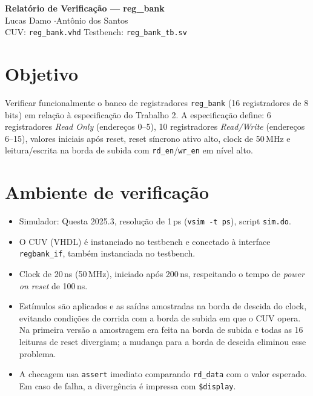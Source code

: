 \documentclass[a4paper,11pt]{article}
\begin{document}
\begin{center}
    {\large\bfseries Relatório de Verificação --- reg\_bank}\\[4pt]
    Lucas Damo \quad$\cdot$\quad Antônio dos Santos\\[4pt]
    CUV: \texttt{reg\_bank.vhd} \quad Testbench: \texttt{reg\_bank\_tb.sv}
\end{center}

\section{Objetivo}

Verificar funcionalmente o banco de registradores \texttt{reg\_bank} (16 registradores de 8 bits)
em relação à especificação do Trabalho 2. A especificação define: 6 registradores
\emph{Read Only} (endereços 0--5), 10 registradores \emph{Read/Write} (endereços 6--15), valores
iniciais após reset, reset síncrono ativo alto, clock de 50\,MHz e leitura/escrita
na borda de subida com \texttt{rd\_en}/\texttt{wr\_en} em nível alto.

\section{Ambiente de verificação}

\begin{itemize}
    \item Simulador: Questa 2025.3, resolução de 1\,ps (\texttt{vsim -t ps}), script \texttt{sim.do}.
    \item O CUV (VHDL) é instanciado no testbench e conectado à interface \texttt{regbank\_if},
          também instanciada no testbench.
    \item Clock de 20\,ns (50\,MHz), iniciado após 200\,ns, respeitando o tempo de
          \emph{power on reset} de 100\,ns.
    \item Estímulos são aplicados e as saídas amostradas na borda de descida do clock,
          evitando condições de corrida com a borda de subida em que o CUV opera.
          Na primeira versão a amostragem era feita na borda de subida e todas as
          16 leituras de reset divergiam; a mudança para a borda de descida eliminou
          esse problema.
    \item A checagem usa \texttt{assert} imediato comparando \texttt{rd\_data} com o valor
          esperado. Em caso de falha, a divergência é impressa com \texttt{\$display}.
\end{itemize}
\end{document}
